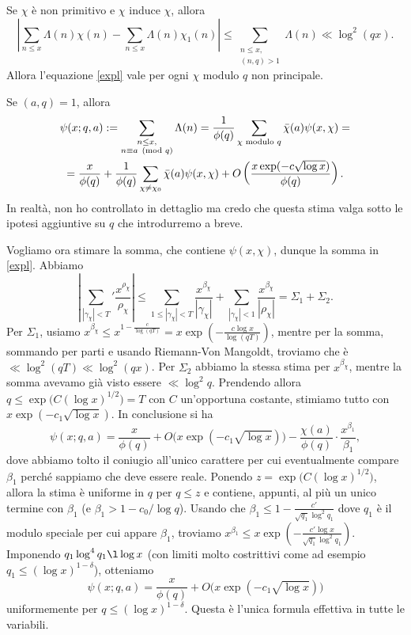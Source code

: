 \begin{oss}
  Se $\chi$ è non primitivo e $\chi$ induce $\chi$, allora
  $$\left| \sum_{n \le x} \Lambda(n)\chi(n)-\sum_{n \le x}\Lambda(n)\chi_1(n)\right| \le \sum_{\substack{n \le x,\\ (n,q)>1}} \Lambda(n) \ll \log^2(qx).$$
  Allora l'equazione \eqref{expl} vale per ogni $\chi$ modulo $q$ non principale.
\end{oss}

\begin{cor}
  Se $(a,q)=1$, allora
  \begin{gather*}
    \psi(x;q,a):=\sum_{\substack{n \le x,\\ n \equiv a \pmod{q}}} \Lambda(n)=\frac{1}{\phi(q)} \sum_{\chi\textnormal{ modulo }q} \bar{\chi}(a)\psi(x,\chi)= \\
    =\frac{x}{\phi(q)}+\frac{1}{\phi(q)}\sum_{\chi\not=\chi_0} \bar{\chi}(a)\psi(x,\chi)+O\left(\frac{x\exp(-c\sqrt{\log x})}{\phi(q)}\right).
  \end{gather*}
  In realtà, non ho controllato in dettaglio ma credo che questa stima valga sotto le ipotesi aggiuntive su $q$ che introdurremo a breve.
\end{cor}

Vogliamo ora stimare la somma, che contiene $\psi(x,\chi)$, dunque la somma in \eqref{expl}. Abbiamo
$$\left|\sum_{|\gamma_\chi|<T}' \frac{x^{\rho_\chi}}{\rho_\chi}\right| \le \sum_{1 \le |\gamma_\chi|<T} \frac{x^{\beta_\chi}}{|\gamma_\chi|}+\sum_{|\gamma_\chi| < 1} \frac{x^{\beta_\chi}}{|\rho_\chi|}=\Sigma_1+\Sigma_2.$$
Per $\Sigma_1$, usiamo $x^{\beta_\chi} \le x^{1-\frac{c}{\log(qT)}}=x\exp\left(-\frac{c\log{x}}{\log(qT)}\right)$, mentre per la somma, sommando per parti e usando Riemann-Von Mangoldt, troviamo che è $\ll \log^2(qT) \ll \log^2(qx)$. Per $\Sigma_2$ abbiamo la stessa stima per $x^{\beta_\chi}$, mentre la somma avevamo già visto essere $\ll \log^2{q}$.
Prendendo allora $q \le \exp\big(C(\log{x})^{1/2}\big)=T$ con $C$ un'opportuna costante, stimiamo tutto con $x\exp(-c_1\sqrt{\log{x}})$. In conclusione si ha
$$\psi(x;q,a)=\frac{x}{\phi(q)}+O\big(x\exp(-c_1\sqrt{\log{x}})\big)-\frac{\chi(a)}{\phi(q)}\cdot\frac{x^{\beta_1}}{\beta_1},$$
dove abbiamo tolto il coniugio all'unico carattere per cui eventualmente compare $\beta_1$ perché sappiamo che deve essere reale. Ponendo $z=\exp\big(C(\log{x})^{1/2}\big)$, allora la stima è uniforme in $q$ per $q \le z$ e contiene, appunti, al più un unico termine con $\beta_1$ (e $\beta_1>1-c_0/\log{q}$).
Usando che $\beta_1 \le 1-\frac{c'}{\sqrt{q_1}\log^2{q_1}}$ dove $q_1$ è il modulo speciale per cui appare $\beta_1$, troviamo $x^{\beta_1} \le x\exp\left(-\frac{c'\log{x}}{\sqrt{q_1}\log^2{q_1}}\right)$.
Imponendo $q_1\log^4{q_1} \l \log{x}$ (con limiti molto costrittivi come ad esempio $q_1 \le (\log{x})^{1-\delta}$), otteniamo
$$\psi(x;q,a)=\frac{x}{\phi(q)}+O\big(x\exp(-c_1\sqrt{\log{x}})\big)$$
uniformemente per $q \le (\log{x})^{1-\delta}$. Questa è l'unica formula effettiva in tutte le variabili.

